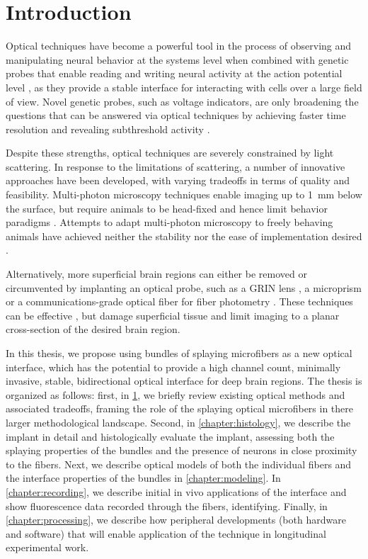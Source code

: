 \chapter{Introduction}
\label{chapter:intro}

\thispagestyle{myheadings}

Optical techniques have become a powerful tool in 
the process of observing and manipulating 
neural behavior at the systems level when combined 
with genetic probes that enable reading and writing 
neural activity at the action potential level 
\cite{Emiliani:2015jl}, as they provide a stable 
interface for interacting with cells over a large 
field of view. Novel genetic probes, such as voltage 
indicators, are only broadening the questions that can 
be answered via optical techniques by achieving 
faster time resolution and revealing subthreshold 
activity \cite{Gong:2015is}.

Despite these strengths, optical techniques are severely 
constrained by light scattering. In response to the 
limitations of scattering, a number of innovative approaches 
have been developed, with varying tradeoffs in terms of quality 
and feasibility. Multi-photon microscopy techniques enable 
imaging up to 1~mm below the surface, but require animals to 
be head-fixed and hence limit behavior paradigms 
\cite{Horton:2013gxa}. Attempts to adapt multi-photon microscopy 
to freely behaving animals have achieved neither the 
stability nor the ease of implementation desired 
\cite{Helmchen:2001tw,Flusberg:2005tq}.

Alternatively, more superficial brain regions can either 
be removed \cite{Dombeck:2010jr} or circumvented 
by implanting an optical probe, such as a GRIN lens 
\cite{Barretto:2009hk}, a microprism \cite{Andermann:2013kc}
or a communications-grade optical fiber for fiber 
photometry \cite{Guo:2015gu}. These techniques can be 
effective \cite{Betley:2015cn}, but damage superficial 
tissue and limit imaging to a planar cross-section 
of the desired brain region. 

In this thesis, we propose using bundles of splaying 
microfibers as a new optical interface, which has the 
potential to provide a high channel count, minimally 
invasive, stable, bidirectional optical interface for 
deep brain regions. The thesis is organized as follows: 
first, in \cref{chapter:intro}, we briefly review 
existing optical methods and associated tradeoffs, 
framing the role of the splaying optical microfibers in
there larger methodological landscape. Second, in 
\cref{chapter:histology}, we describe the implant in 
detail and histologically evaluate the implant, 
assessing both the splaying properties of the bundles
and the presence of neurons in close proximity to
the fibers. Next, we describe optical models of both 
the individual fibers and the interface properties of 
the bundles in \cref{chapter:modeling}. In 
\cref{chapter:recording}, we describe initial in vivo
applications of the interface and show fluorescence 
data recorded through the fibers, identifying. Finally, 
in \cref{chapter:processing}, we describe how peripheral 
developments (both hardware and software) that will enable 
application of the technique in longitudinal experimental 
work.

